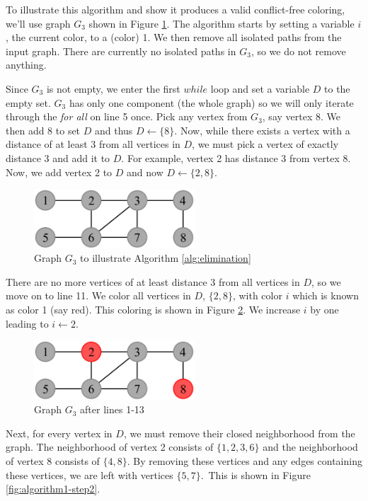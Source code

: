 \documentclass{sig-alternate}
\begin{document}
To illustrate this algorithm and show it produces a valid conflict-free coloring, we'll use graph $G_3$ shown in Figure \ref{fig:algorithm1}. The algorithm starts by setting a variable $i$, the current color, to a (color) 1. We then remove all isolated paths from the input graph. There are currently no isolated paths in $G_3$, so we do not remove anything.

Since $G_3$ is not empty, we enter the first $while$ loop and set a variable $D$ to the empty set. $G_3$ has only one component (the whole graph) so we will only iterate through the \emph{for all} on line 5 once. Pick any vertex from $G_3$, say vertex 8. We then add 8 to set $D$ and thus $D \gets \{8\}$. Now, while there exists a vertex with a distance of at least 3 from all vertices in $D$, we must pick a vertex of exactly distance 3 and add it to $D$. For example, vertex 2 has distance 3 from vertex 8. Now, we add vertex 2 to $D$ and now $D \gets \{2, 8\}$.

\begin{figure}[h]
	\centering
	\includegraphics[width=6cm]{../figures/algorithm1.pdf}
	\caption{Graph $G_3$ to illustrate Algorithm \ref{alg:elimination}}\label{fig:algorithm1}
\end{figure}

There are no more vertices of at least distance 3 from all vertices in $D$, so we move on to line 11. We color all vertices in $D$, $\{2,8\}$, with color $i$ which is known as color 1 (say red). This coloring is shown in Figure \ref{fig:algorithm1-step1}. We increase $i$ by one leading to $i \gets 2$.

\begin{figure}[h]
	\centering
	\includegraphics[width=6cm]{../figures/algorithm1-step1.pdf}
	\caption{Graph $G_3$ after lines 1-13}\label{fig:algorithm1-step1}
\end{figure}

Next, for every vertex in $D$, we must remove their closed neighborhood from the graph. The neighborhood of vertex 2 consists of $\{1,2,3,6\}$ and the neighborhood of vertex 8 consists of $\{4,8\}$. By removing these vertices and any edges containing these vertices, we are left with vertices $\{5, 7\}$.~This is shown in Figure \ref{fig:algorithm1-step2}.
\end{document}
